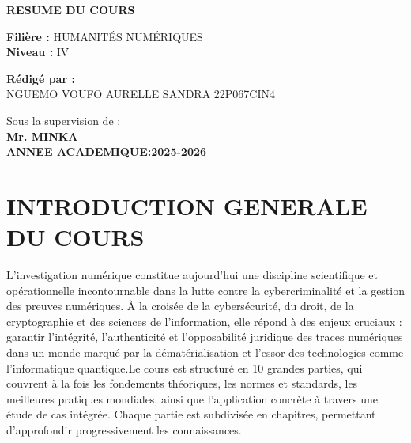 \documentclass[12pt,a4paper]{article}
\begin{document}
\begin{titlepage}
		
		\vspace{1cm}
		
		\begin{center}
		
			\colorbox{blue!70}{\parbox{1\textwidth}{\centering
					\textbf{\color{white}{SEC 4031 \quad INTRODUCTION AUX TECHNIQUES D'INVESTTGATION NUMERIQUE}}
			}}
			
			\vspace{0.5cm}
			
			\colorbox{gray!30}{\parbox{0.9\textwidth}{\centering
					\textbf{RESUME DU COURS}
			}}
		\end{center}
		
		\vspace{1cm}
		
		\noindent
		\textbf{Filière :} HUMANITÉS NUMÉRIQUES \\[0.5cm]
		\textbf{Niveau :} IV
		
		\vspace{1cm}
		
		\noindent
		\textbf{Rédigé par :} \\[0.5cm]
		\quad          NGUEMO VOUFO AURELLE SANDRA \hfill 22P067\hfill CIN4
		
		\vspace{2cm}
		
		\begin{center}
			Sous la supervision de : \\
			\textbf{\hfill Mr. MINKA}\\[1.5 cm]
			\textbf{ANNEE ACADEMIQUE:2025-2026}
		\end{center}
		
	\end{titlepage}
	
	\section*{INTRODUCTION GENERALE DU COURS}
	L’investigation numérique constitue aujourd’hui une discipline scientifique et opérationnelle incontournable dans la lutte contre la cybercriminalité et la gestion des preuves numériques. À la croisée de la cybersécurité, du droit, de la cryptographie et des sciences de l’information, elle répond à des enjeux cruciaux : garantir l’intégrité, l’authenticité et l’opposabilité juridique des traces numériques dans un monde marqué par la dématérialisation et l’essor des technologies comme l’informatique quantique.Le cours est structuré en 10 grandes parties, qui couvrent à la fois les fondements théoriques, les normes et standards, les meilleures pratiques mondiales, ainsi que l’application concrète à travers une étude de cas intégrée. Chaque partie est subdivisée en chapitres, permettant d’approfondir progressivement les connaissances.
	
\end{document}
